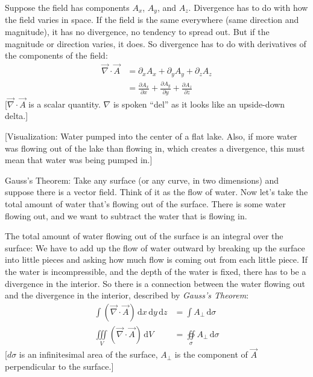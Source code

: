 \documentclass[pagesize,headsepline,10pt,parskip=half,BCOR=12mm]{scrreprt}
\begin{document}
        Suppose the field has components $A_x$, $A_y$, and $A_z$.
        Divergence has to do with how the field varies in space. If
        the field is the same everywhere (same direction and
        magnitude), it has no divergence, no tendency to spread out.
        But if the magnitude or direction varies, it does. So
        divergence has to do with derivatives of the components of
        the field:
        \begin{align}
          \vec \nabla \cdot \vec A &= \partial_x A_x + \partial_y
          A_y + \partial_z A_z \\
          &= \frac{\partial A_x}{\partial x} + \frac{\partial
          A_y}{\partial y} + \frac{\partial A_z}{\partial z}
        \end{align}
        [$\vec \nabla \cdot \vec A$ is a scalar quantity. $\nabla$
        is spoken ``del'' as it looks like an upside-down delta.]

        [Visualization: Water pumped into the center of a flat
        lake. Also, if more water was flowing out of the lake than
        flowing in, which creates a divergence, this must mean that
        water was being pumped in.]

        Gauss's Theorem: Take any surface (or any curve, in two
        dimensions) and suppose there is a vector field. Think of
        it as the flow of water.  Now let's take the total amount
        of water that's flowing out of the surface. There is some
        water flowing out, and we want to subtract the water that
        is flowing in.

        The total amount of water flowing out of the surface is an
        integral over the surface: We have to add up the flow of
        water outward by breaking up the surface into little pieces
        and asking how much flow is coming out from each little
        piece. If the water is incompressible, and the depth of the
        water is fixed, there has to be a divergence in the
        interior.  So there is a connection between the water
        flowing out and the divergence in the interior, described
        by \emph{Gauss's Theorem}:
        \begin{align}\label{eq:gauss}
          \int (\vec \nabla \cdot \vec A)\, \mathrm{d}x\,
          \mathrm{d}y\, \mathrm{d}z &= \int A_\perp\,
          \mathrm{d}\sigma
          \\
          \iiint\limits_V(\vec \nabla \cdot \vec A)\, \mathrm{d}V
          &= \oiint \limits_{\sigma} A_\perp\, \mathrm{d}\sigma
        \end{align}
        [$d\sigma$ is an infinitesimal area of the surface,
        $A_\perp$ is the component of $\vec A$ perpendicular to the
        surface.]
\end{document}
